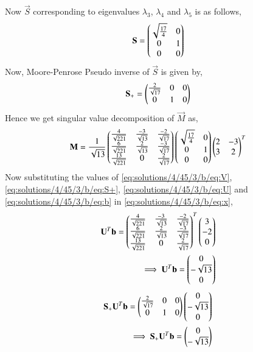 Now $\vec{S}$ corresponding to eigenvalues $\lambda_3$, $\lambda_4$ and  $\lambda_5$ is as follows,
\begin{align}
\mathbf{S} = \begin{pmatrix}\sqrt{\frac{17}{4}}&0\\0&1\\0&0\end{pmatrix}
\end{align}
Now, Moore-Penrose Pseudo inverse of $\vec{S}$ is given by,
\begin{align}
\mathbf{S}_+ = \begin{pmatrix}\frac{2}{\sqrt{17}}&0&0\\0&1&0\end{pmatrix}\label{eq:solutions/4/45/3/b/eq:S+}
\end{align}
Hence we get singular value decomposition of $\vec{M}$ as,
\begin{align}
\mathbf{M} = \frac{1}{\sqrt{13}}\begin{pmatrix}\frac{4}{\sqrt{221}} &\frac{-3}{\sqrt{13}} & \frac{-2}{\sqrt{17}}\\\frac{6}{\sqrt{221}} &\frac{2}{\sqrt{13}} &\frac{-3}{\sqrt{17}} \\\frac{13}{\sqrt{221}}&0& \frac{2}{\sqrt{17}}\end{pmatrix}\begin{pmatrix}\sqrt{\frac{17}{4}}&0\\0&1\\0&0\end{pmatrix}\begin{pmatrix}2&-3\\3&2\end{pmatrix}^T
\end{align}
Now substituting the values of \eqref{eq:solutions/4/45/3/b/eq:V}, \eqref{eq:solutions/4/45/3/b/eq:S+}, \eqref{eq:solutions/4/45/3/b/eq:U} and \eqref{eq:solutions/4/45/3/b/eq:b} in \eqref{eq:solutions/4/45/3/b/eq:x},
\begin{align}
\mathbf{U}^T\mathbf{b} = \begin{pmatrix}\frac{4}{\sqrt{221}} &\frac{-3}{\sqrt{13}} & \frac{-2}{\sqrt{17}}\\\frac{6}{\sqrt{221}} &\frac{2}{\sqrt{13}} &\frac{-3}{\sqrt{17}} \\\frac{13}{\sqrt{221}}&0& \frac{2}{\sqrt{17}}\end{pmatrix}^T\begin{pmatrix}3\\-2\\0\end{pmatrix}\\
\implies \mathbf{U}^T\mathbf{b} = \begin{pmatrix}0\\-\sqrt{13}\\0\end{pmatrix}\label{eq:solutions/4/45/3/b/eq:Utb}
\end{align}
\begin{align}
\mathbf{S}_+\mathbf{U}^T\mathbf{b} = \begin{pmatrix}\frac{2}{\sqrt{17}}&0&0\\0&1&0\end{pmatrix}\begin{pmatrix}0\\-\sqrt{13}\\0\end{pmatrix}\\
\implies \mathbf{S}_+\mathbf{U}^T\mathbf{b} = \begin{pmatrix}0\\-\sqrt{13}\end{pmatrix}\label{eq:solutions/4/45/3/b/eq:SUtb}
\end{align}
